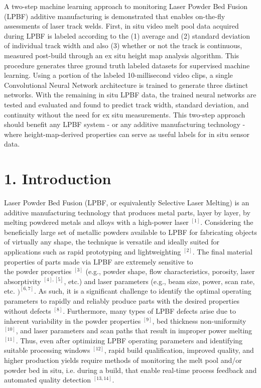 \documentclass[10pt]{article}
\begin{document}
A two-step machine learning approach to monitoring Laser Powder Bed Fusion (LPBF) additive manufacturing is demonstrated that enables on-the-fly assessments of laser track welds. First, in situ video melt pool data acquired during LPBF is labeled according to the (1) average and (2) standard deviation of individual track width and also (3) whether or not the track is continuous, measured post-build through an ex situ height map analysis algorithm. This procedure generates three ground truth labeled datasets for supervised machine learning. Using a portion of the labeled 10-millisecond video clips, a single Convolutional Neural Network architecture is trained to generate three distinct networks. With the remaining in situ LPBF data, the trained neural networks are tested and evaluated and found to predict track width, standard deviation, and continuity without the need for ex situ measurements. This two-step approach should benefit any LPBF system - or any additive manufacturing technology - where height-map-derived properties can serve as useful labels for in situ sensor data.

\section*{1. Introduction}
Laser Powder Bed Fusion (LPBF, or equivalently Selective Laser Melting) is an additive manufacturing technology that produces metal parts, layer by layer, by melting powdered metals and alloys with a high-power laser ${ }^{[1]}$. Considering the beneficially large set of metallic powders available to LPBF for fabricating objects of virtually any shape, the technique is versatile and ideally suited for applications such as rapid prototyping and lightweighting ${ }^{[2]}$. The final material properties of parts made via LPBF are extremely sensitive to\\
the powder properties ${ }^{[3]}$ (e.g., powder shape, flow characteristics, porosity, laser absorptivity ${ }^{[4],[5]}$, etc.) and laser parameters (e.g., beam size, power, scan rate, etc. $)^{[6,7]}$. As such, it is a significant challenge to identify the optimal operating parameters to rapidly and reliably produce parts with the desired properties without defects ${ }^{[8]}$. Furthermore, many types of LPBF defects arise due to inherent variability in the powder properties ${ }^{[9]}$, bed thickness non-uniformity ${ }^{[10]}$, and laser parameters and scan paths that result in improper power melting $^{[11]}$. Thus, even after optimizing LPBF operating parameters and identifying suitable processing windows ${ }^{[12]}$, rapid build qualification, improved quality, and higher production yields require methods of monitoring the melt pool and/or powder bed in situ, i.e. during a build, that enable real-time process feedback and automated quality detection ${ }^{[13,14]}$.
\end{document}
